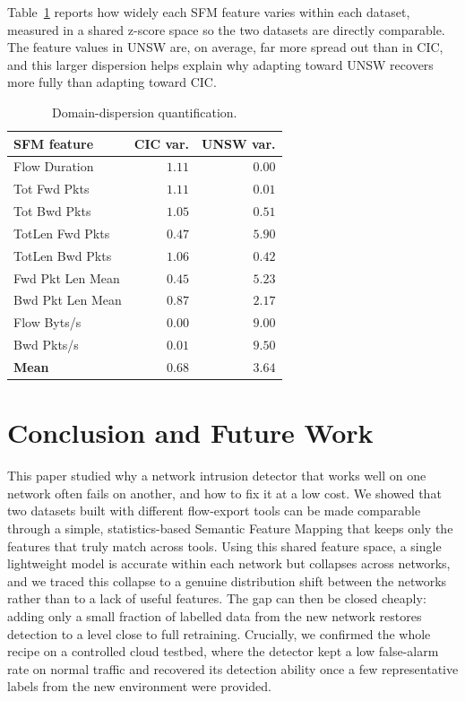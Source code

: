 \documentclass[11pt,a4paper]{article}
\begin{document}
Table~\ref{tab:dispersion} reports how widely each SFM feature varies within each dataset,
measured in a shared z-score space so the two datasets are directly comparable. The
feature values in UNSW are, on average, far more spread out than in CIC, and this larger
dispersion helps explain why adapting toward UNSW recovers more fully than adapting toward
CIC.

\begin{table}[htbp]
\centering
\caption{Domain-dispersion quantification.}
\label{tab:dispersion}
\footnotesize
\begin{tabular}{lrr}
\toprule
SFM feature & CIC var. & UNSW var. \\
\midrule
Flow Duration    & $1.11$ & $0.00$ \\
Tot Fwd Pkts     & $1.11$ & $0.01$ \\
Tot Bwd Pkts     & $1.05$ & $0.51$ \\
TotLen Fwd Pkts  & $0.47$ & $5.90$ \\
TotLen Bwd Pkts  & $1.06$ & $0.42$ \\
Fwd Pkt Len Mean & $0.45$ & $5.23$ \\
Bwd Pkt Len Mean & $0.87$ & $2.17$ \\
Flow Byts/s      & $0.00$ & $9.00$ \\
Bwd Pkts/s       & $0.01$ & $9.50$ \\
\midrule
\textbf{Mean}    & $\mathbf{0.68}$ & $\mathbf{3.64}$ \\
\bottomrule
\end{tabular}
\end{table}

\section{Conclusion and Future Work}
This paper studied why a network intrusion detector that works well on one network often
fails on another, and how to fix it at a low cost. We showed that two datasets built with
different flow-export tools can be made comparable through a simple, statistics-based
Semantic Feature Mapping that keeps only the features that truly match across tools. Using
this shared feature space, a single lightweight model is accurate within each network but
collapses across networks, and we traced this collapse to a genuine distribution shift
between the networks rather than to a lack of useful features. The gap can then be closed
cheaply: adding only a small fraction of labelled data from the new network restores
detection to a level close to full retraining. Crucially, we confirmed the whole recipe on
a controlled cloud testbed, where the detector kept a low false-alarm rate on normal traffic and
recovered its detection ability once a few representative labels from the new environment
were provided.
\end{document}
